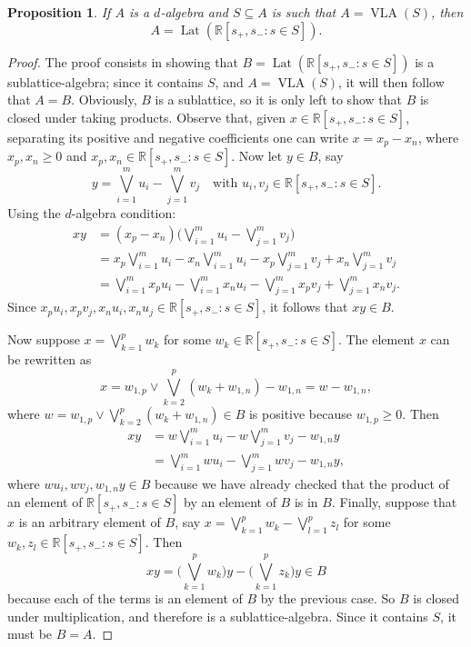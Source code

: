 \documentclass{memo-l}
\newtheorem{prop}[theorem]{Proposition}
\theoremstyle{definition}
\theoremstyle{remark}
\numberwithin{section}{chapter}
\numberwithin{equation}{chapter}
\newcommand\R{\ensuremath{\mathbb{R}}}
\newcommand{\VLA}{\operatorname{VLA}}
\DeclareMathOperator{\Lat}{Lat}
\begin{document}
\begin{prop}\label{prop:simplificationLLA}
    If $A$ is a $d$-algebra and $S\subseteq A$ is such that $A=\VLA(S)$, then
    \[
    A=\Lat(\R[s_+, s_- : s \in S]).
    \]
\end{prop}
\begin{proof}
    The proof consists in showing that $B=\Lat(\R[s_+, s_- : s \in
    S])$ is a sublattice-algebra; since it contains $S$, and
    $A=\VLA(S)$, it will then follow that $A=B$.
    Obviously, $B$ is a sublattice, so it is only left to show that
    $B$ is closed under taking products. Observe that, given $x \in \R[s_+, s_- : s
    \in S]$, separating its positive and negative coefficients one can
    write $x=x_p-x_n$, where
    $x_p,x_n\ge 0$ and $x_p,x_n \in \R[s_+, s_- : s
    \in S]$. Now let $y \in B$, say
    \[
    y=\bigvee_{i=1} ^{m}u_i-\bigvee_{j=1} ^{m}v_j\quad\text{with
    }u_i,v_j \in \R[s_+,s_-:s \in S].
    \]
    Using the $d$-algebra condition:
    \begin{align*}
        xy&=(x_p-x_n)\bigg(\bigvee_{i=1} ^{m}u_i-\bigvee_{j=1}
        ^{m}v_j\bigg)\\
          &=x_p\bigvee_{i=1} ^{m}u_i - x_n\bigvee_{i=1} ^{m}u_i -
          x_p\bigvee_{j=1} ^{m}v_j+x_n\bigvee_{j=1} ^{m}v_j\\
          &=\bigvee_{i=1} ^{m}x_pu_i - \bigvee_{i=1} ^{m}x_nu_i -
          \bigvee_{j=1} ^{m}x_pv_j+\bigvee_{j=1} ^{m}x_nv_j.
    \end{align*}
    Since $x_pu_i,x_pv_j,x_n u_i, x_n u_j \in
    \R[s_+, s_- : s \in S]$, it follows that $xy \in B$.

    Now suppose $x=\bigvee_{k=1} ^{p} w_k$ for some $w_k \in
    \R[s_+, s_- : s \in S]$. The element $x$ can be rewritten as
    \[
    x=w_{1,p}\vee \bigvee_{k=2} ^{p} (w_k+w_{1,n}) -
    w_{1,n}=w-w_{1,n},
    \]
    where $w=w_{1,p}\vee \bigvee_{k=2} ^{p} (w_k+w_{1,n}) \in B$ is positive
    because $w_{1,p}\ge 0$. Then
    \begin{align*}
        xy&=w\bigvee_{i=1} ^{m}u_i-w\bigvee_{j=1} ^{m}v_j-w_{1,n} y\\
            &=\bigvee_{i=1} ^{m}wu_i-\bigvee_{j=1} ^{m}wv_j-w_{1,n} y,
    \end{align*}
    where $w u_i, wv_j, w_{1,n} y \in B$ because we have already
    checked that the product of an element of $\R[s_+, s_- : s \in S]$ by an
    element of $B$ is in $B$. Finally, suppose that $x$ is an
    arbitrary
    element of $B$, say $x=\bigvee_{k=1}
    ^{p} w_k-\bigvee_{l=1} ^{p}z_l$ for some $w_k, z_l \in
    \R[s_+, s_- : s \in S]$. Then
    \[
    xy=\bigg(\bigvee_{k=1} ^{p}w_k\bigg)y-\bigg(\bigvee_{k=1}
    ^{p}z_k\bigg)y \in B
    \]
    because each of the terms is an element of $B$ by the previous case.
    So $B$ is closed under multiplication, and therefore is a
    sublattice-algebra. Since it contains $S$, it must be $B=A$.
\end{proof}
\end{document}
